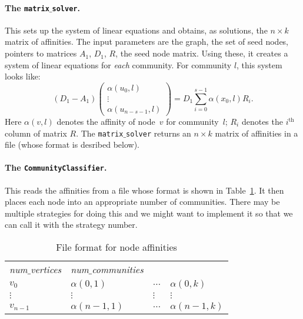 \documentclass[12pt]{article}
\renewcommand{\th}{\ensuremath{^{\mathrm{th}}}}
\begin{document}
\paragraph{The \texttt{matrix$\_$solver}.} This sets up the system of 
linear equations and obtains, as solutions, the $n \times k$ matrix 
of affinities. The input parameters are the graph, the set of seed nodes, 
pointers to matrices $A_1$, $D_1$, $R$, the seed node matrix. Using these, 
it creates a system of linear equations for \emph{each} community.   
For community $l$, this system looks like:
\[
	(D_1 -  A_1) \begin{pmatrix} \alpha(u_0, l) \\ \vdots \\ \alpha(u_{n - s -1}, l) \end{pmatrix}	
		= D_1 \sum_{i = 0}^{s - 1} \alpha(x_0, l) R_i. 
\] 
Here $\alpha(v, l)$ denotes the affinity of node~$v$ for community~$l$; $R_i$ 
denotes the $i\th$ column of matrix $R$. The \texttt{matrix$\_$solver} returns 
an $n \times k$ matrix of affinities in a file (whose format is desribed below).

\paragraph{The \texttt{CommunityClassifier}.} This reads the affinities 
from a file whose format is shown in Table~\ref{tab:node_aff}.
It then places each node into an appropriate number of communities. There 
may be multiple strategies for doing this and we might want to implement it 
so that we can call it with the strategy number.  

\begin{table}[ht]
\centering
\begin{tabular}{llll}
\emph{num$\_$vertices} & \emph{num$\_$communities} &  & \\
$v_0$               & $\alpha(0, 1)$ & $\ldots$ & $\alpha(0, k)$ \\
$\vdots$ & $\vdots$ & $\vdots$ & $\vdots$ \\
$v_{n-1}$  & $\alpha(n-1, 1)$ & $\ldots$ & $\alpha(n-1, k)$ 
\end{tabular}
\caption{File format for node affinities}\label{tab:node_aff}
\end{table}
%
\end{document}
